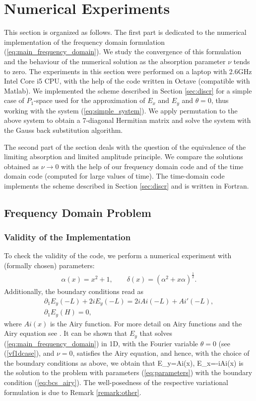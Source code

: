 
\section{Numerical Experiments}
This section is organized as follows. The first part is dedicated to the numerical implementation
of the frequency domain formulation (\ref{eq:main_frequency_domain}). We study the convergence of this formulation and the behaviour 
of the numerical solution as the absorption parameter $\nu$ tends to zero. The experiments in this section were 
performed on a laptop with 2.6GHz Intel Core i5 CPU, with the help of the code written in Octave (compatible with Matlab). 
We implemented the scheme described in Section \ref{sec:discr} for a simple case of $P_{1}$-space used 
for the approximation of $E_{x}$ and $E_{y}$ and $\theta=0$, thus working with the system (\ref{eq:simple_system}). 
We apply permutation to the above system 
to obtain a 7-diagonal Hermitian matrix and solve the system with the Gauss back substitution algorithm. 

The second part of the section deals with the question of the equivalence of the limiting absorption and limited amplitude 
principle. We compare the solutions obtained as $\nu\rightarrow 0$ with the help of our frequency domain code 
and of the time domain code (computed for large values of time). 
The time-domain code implements the scheme described in Section \ref{sec:discr} and 
is written in Fortran. 
\subsection{Frequency Domain Problem}
\label{sec:freq_dep}
\subsubsection{Validity of the Implementation}
To check the validity of the code, we perform a numerical experiment with (formally chosen) parameters:
\begin{align}
\label{eq:parameters}
\alpha(x)=x^2+1,\qquad \delta(x)=\left(\alpha^2+x\alpha\right)^{\frac{1}{2}}.
\end{align}
Additionally, the boundary conditions read as 
\begin{align}
\label{eq:bcs_airy}
\partial_{1}E_{y}(-L)+2iE_{y}(-L)=2iAi(-L)+Ai'(-L),\\
\partial_{1}E_{y}(H)=0,
\end{align}
where $Ai(x)$ is the Airy function. 
For more detail on Airy functions and the Airy equation see \cite[Chapter 10.4]{abramowitz_stegun}. 
It can be shown that $E_{y}$ that solves (\ref{eq:main_frequency_domain}) in 1D, with the Fourier variable $\theta=0$ (see (\ref{vf1dcase}), and $\nu=0$, 
satisfies the Airy equation, and hence, 
with the choice of the boundary conditions as above, we obtain that 
\bealn
E_{y}=Ai(x),\qquad 
E_{x}=-iAi(x)
\eealn
is the solution to the problem with parameters (\ref{eq:parameters}) with the boundary condition (\ref{eq:bcs_airy}). 
The well-posedness of the respective variational formulation is due to Remark \ref{remark:other}. 

